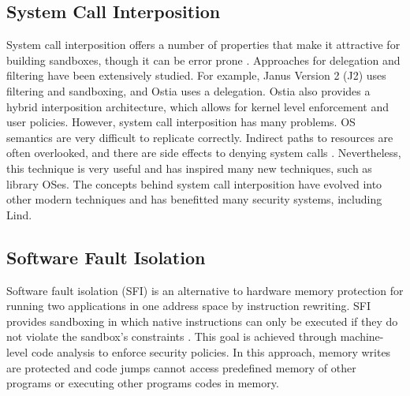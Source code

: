 \subsection{System Call Interposition}

System call interposition offers a number of properties that make it
attractive for building sandboxes, though it can be error prone
\cite{SCI-04}. Approaches for delegation and filtering have been
extensively studied. For example, 
Janus Version 2 (J2) \cite{Janus0:96, Janus:99} uses filtering and
sandboxing, and Ostia \cite{SCI-04} uses a delegation.
Ostia also provides a hybrid interposition architecture, which allows
for kernel level enforcement and user policies.
%
However, system call interposition has many problems.
OS semantics are very difficult to replicate correctly. Indirect paths
to resources are often overlooked,
and there are side effects to denying system calls
\cite{Problems-SCI}.
Nevertheless, this technique is very useful and has inspired many new
techniques, such as library OSes.
The concepts behind system call interposition have evolved into other
modern techniques
and has benefitted many security systems, including Lind. 

\subsection{Software Fault Isolation}
Software fault isolation (SFI) is an alternative to hardware memory
protection for running two applications in one address space by
instruction rewriting. SFI provides sandboxing in which native
instructions can only be executed if they do not violate the sandbox's
constraints \cite{SFI:93}. This goal is achieved through machine-level
code analysis to enforce security policies. In this approach, memory
writes are protected and code jumps cannot access predefined memory of
other programs or executing other programs codes in memory.

